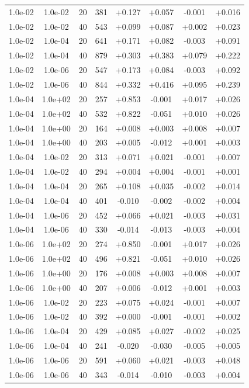 \documentclass[11pt,a4paper]{article}
\begin{document}
\begin{table}
\begin{tabular}{*{8}c}
 1.0e-02 	 & 1.0e-02 	 & 20 & 381 	 & +0.127 & +0.057 & -0.001 & +0.016 \\ 
 1.0e-02 	 & 1.0e-02 	 & 40 & 543 	 & +0.099 & +0.087 & +0.002 & +0.023 \\
 1.0e-02 	 & 1.0e-04 	 & 20 & 641 	 & +0.171 & +0.082 & -0.003 & +0.091 \\ 
 1.0e-02 	 & 1.0e-04 	 & 40 & 879 	 & +0.303 & +0.383 & +0.079 & +0.222 \\ 
 1.0e-02 	 & 1.0e-06 	 & 20 & 547 	 & +0.173 & +0.084 & -0.003 & +0.092 \\
 1.0e-02 	 & 1.0e-06 	 & 40 & 844 	 & +0.332 & +0.416 & +0.095 & +0.239 \\ 
 \hline 
 1.0e-04 	 & 1.0e+02 	 & 20 & 257 	 & +0.853 & -0.001 & +0.017 & +0.026 \\ 
 1.0e-04 	 & 1.0e+02 	 & 40 & 532 	 & +0.822 & -0.051 & +0.010 & +0.026 \\ 
 1.0e-04 	 & 1.0e+00 	 & 20 & 164 	 & +0.008 & +0.003 & +0.008 & +0.007 \\ 
 1.0e-04 	 & 1.0e+00 	 & 40 & 203 	 & +0.005 & -0.012 & +0.001 & +0.003 \\  
 1.0e-04 	 & 1.0e-02 	 & 20 & 313 	 & +0.071 & +0.021 & -0.001 & +0.007 \\ 
 1.0e-04 	 & 1.0e-02 	 & 40 & 294 	 & +0.004 & +0.004 & -0.001 & +0.001 \\ 
 1.0e-04 	 & 1.0e-04 	 & 20 & 265 	 & +0.108 & +0.035 & -0.002 & +0.014 \\
 1.0e-04 	 & 1.0e-04 	 & 40 & 401 	 & -0.010 & -0.002 & -0.002 & +0.004 \\ 
 1.0e-04 	 & 1.0e-06 	 & 20 & 452 	 & +0.066 & +0.021 & -0.003 & +0.031 \\ 
 1.0e-04 	 & 1.0e-06 	 & 40 & 330 	 & -0.014 & -0.013 & -0.003 & +0.004 \\ 
 \hline
 1.0e-06 	 & 1.0e+02 	 & 20 & 274 	 & +0.850 & -0.001 & +0.017 & +0.026 \\ 
 1.0e-06 	 & 1.0e+02 	 & 40 & 496 	 & +0.821 & -0.051 & +0.010 & +0.026 \\
 1.0e-06 	 & 1.0e+00 	 & 20 & 176 	 & +0.008 & +0.003 & +0.008 & +0.007 \\ 
 1.0e-06 	 & 1.0e+00 	 & 40 & 207 	 & +0.006 & -0.012 & +0.001 & +0.003 \\ 
 1.0e-06 	 & 1.0e-02 	 & 20 & 223 	 & +0.075 & +0.024 & -0.001 & +0.007 \\ 
 1.0e-06 	 & 1.0e-02 	 & 40 & 392 	 & +0.000 & -0.001 & -0.001 & +0.002 \\ 
 1.0e-06 	 & 1.0e-04 	 & 20 & 429 	 & +0.085 & +0.027 & -0.002 & +0.025 \\ 
 1.0e-06 	 & 1.0e-04 	 & 40 & 241 	 & -0.020 & -0.030 & -0.005 & +0.005 \\ 
 1.0e-06 	 & 1.0e-06 	 & 20 & 591 	 & +0.060 & +0.021 & -0.003 & +0.048 \\ 
 1.0e-06 	 & 1.0e-06 	 & 40 & 343 	 & -0.014 & -0.010 & -0.003 & +0.004 \\ 

\end{tabular}
\label{TAB::timesteps}
\end{table} 
\end{document}
